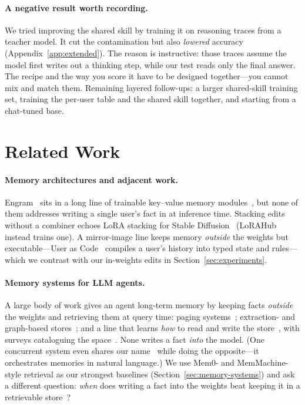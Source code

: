 \documentclass[letterpaper]{article} %
\begin{document}
\paragraph{A negative result worth recording.} We tried improving the
shared skill by training it on reasoning traces from a teacher model.
It cut the contamination but also \emph{lowered} accuracy
(Appendix~\ref{app:extended}). The reason is instructive: those traces
assume the model first writes out a thinking step, while our test
reads only the final answer. The recipe and the way you score it have
to be designed together---you cannot mix and match them. Remaining
layered follow-ups: a larger shared-skill training set, training the
per-user table and the shared skill together, and starting from a
chat-tuned base.

\section{Related Work}
\label{sec:related-work}

\paragraph{Memory architectures and adjacent work.}
Engram~\citep{cheng2026engram} sits in a long line of trainable
key--value memory modules~\citep{geva2021kv,lample2019pkm,he2024peer,berges2025memory,ultramem2025,overencoding2025,scone2025,pagnoni2025blt,superbpe2025},
but none of them addresses writing a single user's fact in at
inference time. Stacking edits without a combiner echoes LoRA
stacking for Stable Diffusion~\citep{lora_diffusion}
(LoRAHub~\citep{huang2023lorahub} instead trains one). A mirror-image
line keeps memory \emph{outside} the weights but executable---User as
Code~\citep{li2026userascode} compiles a user's history into typed
state and rules---which we contrast with our in-weights edits in
Section~\ref{sec:experiments}.

\paragraph{Memory systems for LLM agents.}
A large body of work gives an agent long-term memory by keeping
facts \emph{outside} the weights and retrieving them at query
time: paging systems~\citep{packer2023memgpt}; extraction- and
graph-based stores~\citep{chhikara2025mem0,xu2025amem,rasmussen2025zep,li2025memos,hu2026evermemos,wang2026memmachine};
and a line that learns \emph{how} to read and write the
store~\citep{yan2025memoryr1,yu2026agemem,wang2025memalpha}, with
surveys cataloguing the
space~\citep{zhang2024memorysurvey,wu2025humantoai,du2026memorysurvey}.
None writes a fact \emph{into} the model. (One concurrent system
even shares our name~\citep{patel2025engram} while doing the
opposite---it orchestrates memories in natural language.) We use
Mem0- and MemMachine-style retrieval as our strongest baselines
(Section~\ref{sec:memory-systems}) and ask a different question:
\emph{when} does writing a fact into the weights beat keeping it in
a retrievable store~\citep{pollertlam2026beyondcontext}?
\end{document}
